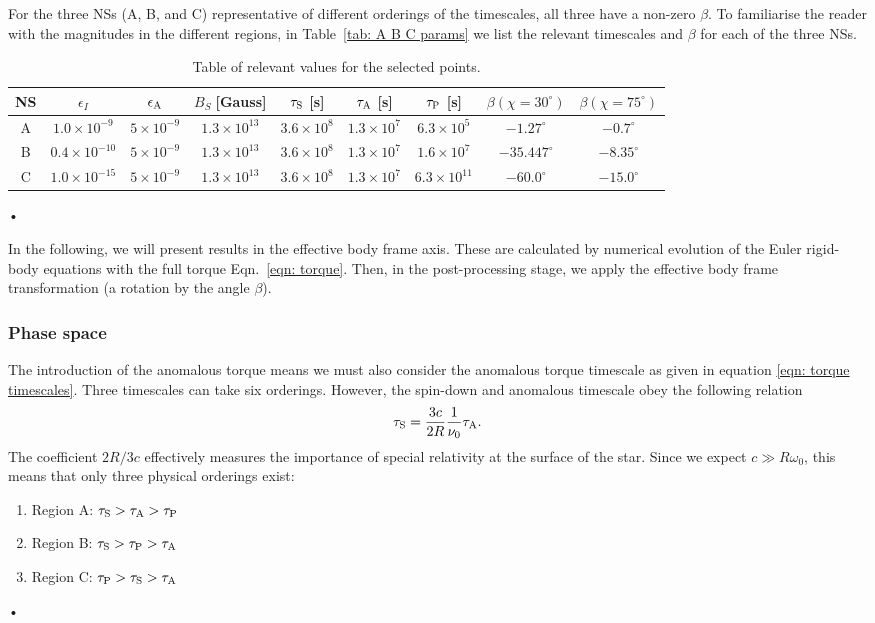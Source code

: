\documentclass[../full_thesis/full_thesis.tex]{subfiles}
\begin{document}
For the three NSs (A, B, and C) representative of different orderings of the timescales, all
three have a non-zero $\beta$. To familiarise the reader with the magnitudes in
the different regions, in Table~\ref{tab: A B C params} we list the relevant
timescales and $\beta$ for each of the three NSs.
\begin{table}[ht]
{\footnotesize
\centering
	\begin{tabular}[ht]{|c|c|c|c|c|c|c|c|c|}\hline
NS &  $\epsilon_{I}$  & $\epsilon_{\mathrm{A}} $ & 	$B_{S} \; $[Gauss] & $\tau_{\mathrm{S}}$ [s] & $\tau_{\mathrm{A}}$ [s] & $ \tau_{\mathrm{P}}$  [s] & $\beta (\chi=30^{\circ})$ & $\beta(\chi=75^{\circ})$ \\ \hline
A & $  1.0\times 10^{-9}  $ & $  5\times 10^{-9}  $ & $  1.3\times 10^{13}  $ & $  3.6\times 10^{8}  $ & $  1.3\times 10^{7}  $ & $  6.3\times 10^{5}  $ & $ -1.27^{\circ} $& $ -0.7^{\circ} $ \\
B & $  0.4\times 10^{-10}  $ & $  5\times 10^{-9}  $ & $  1.3\times 10^{13}  $ & $  3.6\times 10^{8}  $ & $  1.3\times 10^{7}  $ & $  1.6\times 10^{7}  $ & $ -35.447^{\circ} $& $ -8.35^{\circ} $ \\
C & $  1.0\times 10^{-15}  $ & $  5\times 10^{-9}  $ & $  1.3\times 10^{13}  $ & $  3.6\times 10^{8}  $ & $  1.3\times 10^{7}  $ & $  6.3\times 10^{11}  $ & $ -60.0^{\circ} $& $ -15.0^{\circ} $ \\ \hline
	\end{tabular}•}
\caption{Table of relevant values for the selected points. }
\label{tab: A B C params beta}
\end{table}

In the following, we will present results in the effective body frame axis. These
are calculated by numerical evolution of the Euler rigid-body equations with the full
torque Eqn.~\eqref{eqn: torque}. Then, in the post-processing stage, we apply the
effective body frame transformation (a rotation by the angle $\beta$).

\subsubsection{Phase space}

The introduction of the anomalous torque means we must also consider the
anomalous torque timescale as given in equation \eqref{eqn: torque timescales}. Three
timescales can take six orderings. However, the spin-down and anomalous timescale
obey the following relation
\begin{equation}
\tau_{\mathrm{S}} = \frac{3c}{2R}\frac{1}{\nu_{0}}\tau_{\mathrm{A}}.
\end{equation}
The coefficient $2R/3c$ effectively measures the importance of special
relativity at the surface of the star. Since we expect $c\gg R \omega_{0}$, this
means that only three physical orderings exist:
\begin{enumerate}
\item Region A: $\tau_{\mathrm{S}}>\tau_{\mathrm{A}}> \tau_{\mathrm{P}}$
\item Region B: $\tau_{\mathrm{S}}>\tau_{\mathrm{P}}> \tau_{\mathrm{A}}$
\item Region C: $\tau_{\mathrm{P}}>\tau_{\mathrm{S}}> \tau_{\mathrm{A}}$
\end{enumerate}•
\end{document}
